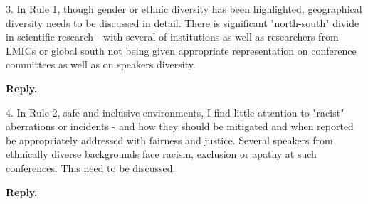 \documentclass{article}
\newenvironment{Reply}{\noindent\color{BlueViolet}\textbf{Reply.}}{\vspace{1em}}
\begin{document}
3. In Rule 1, though gender or ethnic diversity has been highlighted, geographical diversity needs to be discussed in detail. There is significant "north-south" divide in scientific research - with several of institutions as well as researchers from LMICs or global south not being given appropriate representation on conference committees as well as on speakers diversity.

\begin{Reply}
   
\end{Reply}

4. In Rule 2, safe and inclusive environments, I find little attention to "racist" aberrations or incidents - and how they should be mitigated and when reported be appropriately addressed with fairness and justice.
Several speakers from ethnically diverse backgrounds face racism, exclusion or apathy at such conferences. This need to be discussed.

\begin{Reply}




\end{Reply}
\end{document}
